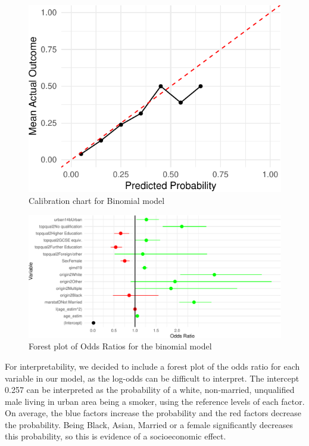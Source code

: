 \documentclass[
  11pt,
  twocolumn]{article}
\begin{document}
\begin{figure}[H]

{\centering \includegraphics{Coursework_files/figure-latex/output-calibration-chart-1} 

}

\caption{Calibration chart for Binomial model}\label{fig:output-calibration-chart}
\end{figure}

\begin{figure}[H]
\includegraphics{Coursework_files/figure-latex/output-forest-plot-1} \caption{Forest plot of Odds Ratios for the binomial model}\label{fig:output-forest-plot}
\end{figure}

For interpretability, we decided to include a forest plot of the odds
ratio for each variable in our model, as the log-odds can be difficult
to interpret. The intercept 0.257 can be interpreted as the probability
of a white, non-married, unqualified male living in urban area being a
smoker, using the reference levels of each factor. On average, the blue
factors increase the probability and the red factors decrease the
probability. Being Black, Asian, Married or a female significantly
decreases this probability, so this is evidence of a socioeconomic
effect.
\end{document}

